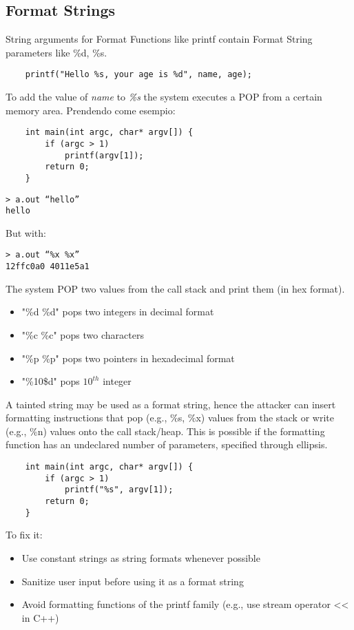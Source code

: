 \documentclass[a4paper, 10pt, titlepage]{article}
\begin{document}
\subsection*{Format Strings}
String arguments for Format Functions like printf contain Format String parameters like \%d, \%s.
\begin{lstlisting}
	printf("Hello %s, your age is %d", name, age);
\end{lstlisting}
To add the value of \textit{name} to \textit{\%s} the system executes a POP from a certain memory area. Prendendo come esempio:
\begin{lstlisting}
	int main(int argc, char* argv[]) {
		if (argc > 1)
			printf(argv[1]);
		return 0;
	}
\end{lstlisting}
\begin{verbatim}
> a.out “hello”
hello
\end{verbatim}
But with:
\begin{verbatim}
> a.out “%x %x”
12ffc0a0 4011e5a1
\end{verbatim}
The system POP two values from the call stack and print them (in hex format).
\begin{itemize}
\item "\%d \%d" pops two integers in decimal format
\item "\%c \%c" pops two characters
\item "\%p \%p" pops two pointers in hexadecimal format
\item "\%10\$d" pops $10^{th}$ integer
\end{itemize}
A tainted string may be used as a format string, hence the attacker can insert formatting instructions that pop (e.g., \%s, \%x) values from the stack or write (e.g., \%n) values onto the call stack/heap. This is possible if the formatting function has an undeclared number of parameters, specified through ellipsis. 
\begin{lstlisting}	
	int main(int argc, char* argv[]) {
		if (argc > 1)
			printf("%s", argv[1]);
		return 0;
	}
\end{lstlisting}
To fix it:
\begin{itemize}
\item Use constant strings as string formats whenever possible
\item Sanitize user input before using it as a format string
\item Avoid formatting functions of the printf family (e.g., use stream operator << in C++)
\end{itemize}
\end{document}
